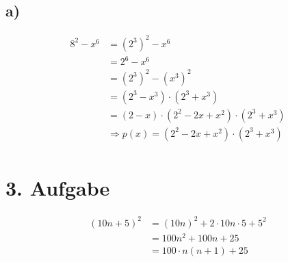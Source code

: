 \documentclass[]{article}
\newcommand{\rarr}{\Rightarrow}
\begin{document}
\subsection*{a)}
\begin{align*}
	&& 8^2 - x^6 &= (2^3)^2 - x^6 &&\\
	&& &= 2^6 - x^6 &&\\
	&& &= (2^3)^2 - (x^3)^2 &&\\
	&& &= (2^3 - x^3) \cdot (2^3 + x^3) &&\\
	&& &= (2-x) \cdot (2^2- 2x + x^2) \cdot (2^3 + x^3) &&\\
	&& &\rarr p(x) = (2^2- 2x + x^2) \cdot (2^3 + x^3) &&\\
\end{align*}


\section*{3. Aufgabe}
\par
\begin{align*}
	&& (10n+5)^2 &= (10n)^2 + 2\cdot 10n \cdot 5 + 5^2 &&\\
	&& &= 100n^2 + 100n + 25 &&\\
	&& &= 100 \cdot n(n + 1) + 25 &&\\
\end{align*}
\end{document}
